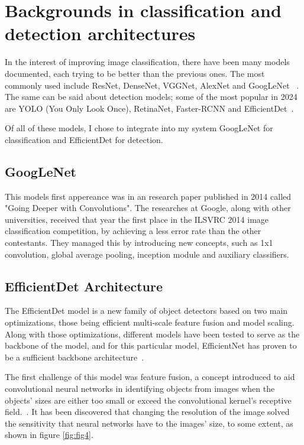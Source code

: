 \chapter{Backgrounds in classification and detection architectures}
\label{chap:ch3}

In the interest of improving image classification, there have been many models documented, each trying to be better than the previous ones. The most commonly used include ResNet, DenseNet, VGGNet, AlexNet and GoogLeNet ~\cite{link8}. The same can be said about detection models; some of the most popular in 2024 are YOLO (You Only Look Once), RetinaNet, Faster-RCNN and EfficientDet~\cite{carte11}.

Of all of these models, I chose to integrate into my system GoogLeNet for classification and EfficientDet for detection.

\section{GoogLeNet}
This models first appereance was in an research paper published in 2014 called "Going Deeper with Convolutions". The researches at Google, along with other universities, received that year the first place in the  ILSVRC 2014 image classification competition, by achieving a less error rate than the other contestants. They managed this by introducing new concepts, such as 1x1 convolution, global average pooling, inception module and auxiliary classifiers.

\section{EfficientDet Architecture}

The EfficientDet model is a new family of object detectors based on two main optimizations, those being efficient multi-scale feature fusion and model scaling. Along with those optimizations, different models have been tested to serve as the backbone of the model, and for this particular model, EfficientNet has proven to be a sufficient backbone architecture~\cite{carte8}.

The first challenge of this model was feature fusion, a concept introduced to aid convolutional neural networks in identifying objects from images when the objects' sizes are either too small or exceed the convolutional kernel's receptive field.~\cite{carte9}. It has been discovered that changing the resolution of the image solved the sensitivity that neural networks have to the images' size, to some extent, as shown in figure \ref{fig:fig4}.

